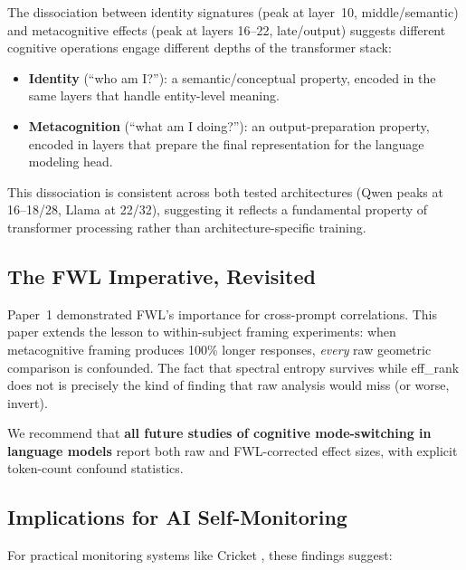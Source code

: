 \documentclass[11pt,a4paper]{article}
\begin{document}
The dissociation between identity signatures (peak at layer~10, middle/semantic) and metacognitive effects (peak at layers 16--22, late/output) suggests different cognitive operations engage different depths of the transformer stack:

\begin{itemize}
    \item \textbf{Identity} (``who am I?''): a semantic/conceptual property, encoded in the same layers that handle entity-level meaning.
    \item \textbf{Metacognition} (``what am I doing?''): an output-preparation property, encoded in layers that prepare the final representation for the language modeling head.
\end{itemize}

This dissociation is consistent across both tested architectures (Qwen peaks at 16--18/28, Llama at 22/32), suggesting it reflects a fundamental property of transformer processing rather than architecture-specific training.

\subsection{The FWL Imperative, Revisited}

Paper~1 demonstrated FWL's importance for cross-prompt correlations. This paper extends the lesson to within-subject framing experiments: when metacognitive framing produces 100\% longer responses, \emph{every} raw geometric comparison is confounded. The fact that spectral entropy survives while eff\_rank does not is precisely the kind of finding that raw analysis would miss (or worse, invert).

We recommend that \textbf{all future studies of cognitive mode-switching in language models} report both raw and FWL-corrected effect sizes, with explicit token-count confound statistics.

\subsection{Implications for AI Self-Monitoring}

For practical monitoring systems like Cricket \citep{lyra2026campaign3}, these findings suggest:
\end{document}

